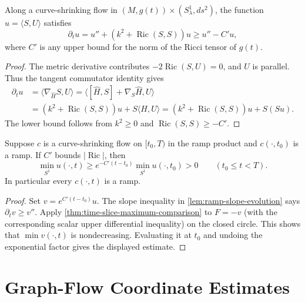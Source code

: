\begin{theorem}
\label{lem:ramp-slope-evolution}
\notready
Along a curve-shrinking flow in
$(M,g(t))\times(S^1_\lambda,ds^2)$, the function
$u=\langle S,U\rangle$ satisfies
\[
 \partial_tu=u''+(k^2+\operatorname{Ric}(S,S))u
 \ge u''-C'u,
\]
where $C'$ is any upper bound for the norm of the Ricci tensor of $g(t)$.
\end{theorem}
\begin{proof}
The metric derivative contributes $-2\operatorname{Ric}(S,U)=0$, and $U$ is
parallel.  Thus the tangent commutator identity gives
\begin{align*}
 \partial_tu
 &=\langle\nabla_{\widehat H}S,U\rangle
 =\langle[\widehat H,S]+\nabla_S\widehat H,U\rangle\\
 &=(k^2+\operatorname{Ric}(S,S))u
   +S\langle H,U\rangle
 =(k^2+\operatorname{Ric}(S,S))u+S(Su).
\end{align*}
The lower bound follows from $k^2\ge0$ and
$\operatorname{Ric}(S,S)\ge-C'$.
\end{proof}

\begin{theorem}
\label{thm:ramp-preservation}
\notready
Suppose $c$ is a curve-shrinking flow on $[t_0,T)$ in the ramp product and
$c(\cdot,t_0)$ is a ramp.  If $C'$ bounds $|\operatorname{Ric}|$, then
\[
 \min_{S^1}u(\cdot,t)\ge
 e^{-C'(t-t_0)}\min_{S^1}u(\cdot,t_0)>0
 \qquad(t_0\le t<T).
\]
In particular every $c(\cdot,t)$ is a ramp.
\end{theorem}
\begin{proof}
Set $v=e^{C'(t-t_0)}u$.  The slope inequality in
\ref{lem:ramp-slope-evolution} says $\partial_tv\ge v''$.
Apply \ref{thm:time-slice-maximum-comparison} to $F=-v$ (with the
corresponding scalar upper differential inequality) on the closed circle.
This shows that $\min v(\cdot,t)$ is nondecreasing.  Evaluating it at $t_0$
and undoing the exponential factor gives the displayed estimate.
\end{proof}

\section{Graph-Flow Coordinate Estimates}

